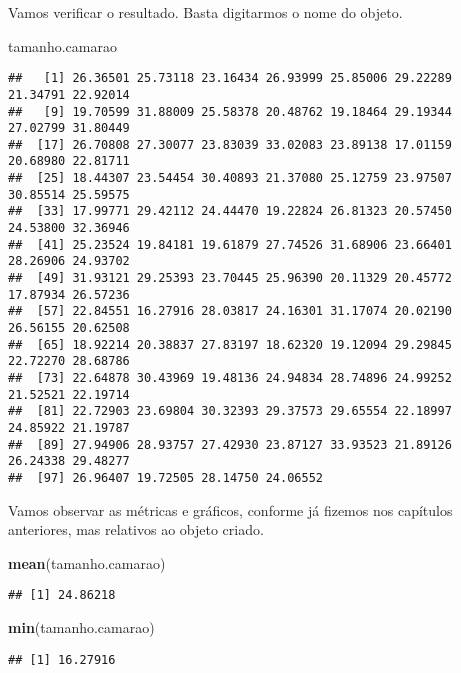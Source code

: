 \documentclass[14pt,titlepage, oneside, openany, a4paper]{book}
\newenvironment{Shaded}{\begin{snugshade}}{\end{snugshade}}
\newcommand{\KeywordTok}[1]{\textcolor[rgb]{0.13,0.29,0.53}{\textbf{#1}}}
\newcommand{\NormalTok}[1]{#1}
\begin{document}
Vamos verificar o resultado. Basta digitarmos o nome do objeto.

\begin{Shaded}
\begin{Highlighting}[]
\NormalTok{tamanho.camarao}
\end{Highlighting}
\end{Shaded}

\begin{verbatim}
##   [1] 26.36501 25.73118 23.16434 26.93999 25.85006 29.22289 21.34791 22.92014
##   [9] 19.70599 31.88009 25.58378 20.48762 19.18464 29.19344 27.02799 31.80449
##  [17] 26.70808 27.30077 23.83039 33.02083 23.89138 17.01159 20.68980 22.81711
##  [25] 18.44307 23.54454 30.40893 21.37080 25.12759 23.97507 30.85514 25.59575
##  [33] 17.99771 29.42112 24.44470 19.22824 26.81323 20.57450 24.53800 32.36946
##  [41] 25.23524 19.84181 19.61879 27.74526 31.68906 23.66401 28.26906 24.93702
##  [49] 31.93121 29.25393 23.70445 25.96390 20.11329 20.45772 17.87934 26.57236
##  [57] 22.84551 16.27916 28.03817 24.16301 31.17074 20.02190 26.56155 20.62508
##  [65] 18.92214 20.38837 27.83197 18.62320 19.12094 29.29845 22.72270 28.68786
##  [73] 22.64878 30.43969 19.48136 24.94834 28.74896 24.99252 21.52521 22.19714
##  [81] 22.72903 23.69804 30.32393 29.37573 29.65554 22.18997 24.85922 21.19787
##  [89] 27.94906 28.93757 27.42930 23.87127 33.93523 21.89126 26.24338 29.48277
##  [97] 26.96407 19.72505 28.14750 24.06552
\end{verbatim}

Vamos observar as métricas e gráficos, conforme já fizemos nos capítulos anteriores, mas relativos ao objeto criado.

\begin{Shaded}
\begin{Highlighting}[]
\KeywordTok{mean}\NormalTok{(tamanho.camarao)}
\end{Highlighting}
\end{Shaded}

\begin{verbatim}
## [1] 24.86218
\end{verbatim}

\begin{Shaded}
\begin{Highlighting}[]
\KeywordTok{min}\NormalTok{(tamanho.camarao)}
\end{Highlighting}
\end{Shaded}

\begin{verbatim}
## [1] 16.27916
\end{verbatim}
\end{document}

